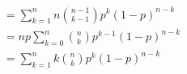 \documentclass[preview]{standalone}
\begin{document}
\begin{align*}
&= \sum ^{n} _{k=1} n {{n-1}\choose{k-1}} p^{k} (1-p)^{n-k}\\ &= n p \sum ^{n} _{k=0} {n\choose{k}} p^{k-1} (1-p)^{n-k}\\ &= \sum ^{n} _{k=1} k {n\choose{k}} p^{k} (1-p)^{n-k}\\
\end{align*}
\end{document}
